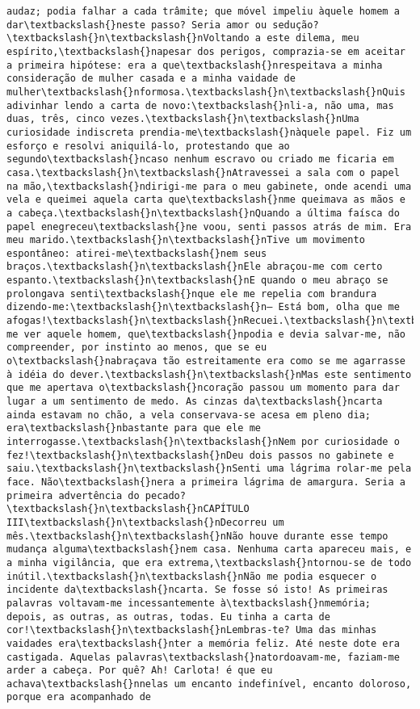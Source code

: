 \begin{Verbatim}[commandchars=\\\{\}]
audaz; podia falhar a cada trâmite; que móvel impeliu àquele homem a dar\textbackslash{}neste passo? Seria amor ou sedução?\textbackslash{}n\textbackslash{}nVoltando a este dilema, meu espírito,\textbackslash{}napesar dos perigos, comprazia-se em aceitar a primeira hipótese: era a que\textbackslash{}nrespeitava a minha consideração de mulher casada e a minha vaidade de mulher\textbackslash{}nformosa.\textbackslash{}n\textbackslash{}nQuis adivinhar lendo a carta de novo:\textbackslash{}nli-a, não uma, mas duas, três, cinco vezes.\textbackslash{}n\textbackslash{}nUma curiosidade indiscreta prendia-me\textbackslash{}nàquele papel. Fiz um esforço e resolvi aniquilá-lo, protestando que ao segundo\textbackslash{}ncaso nenhum escravo ou criado me ficaria em casa.\textbackslash{}n\textbackslash{}nAtravessei a sala com o papel na mão,\textbackslash{}ndirigi-me para o meu gabinete, onde acendi uma vela e queimei aquela carta que\textbackslash{}nme queimava as mãos e a cabeça.\textbackslash{}n\textbackslash{}nQuando a última faísca do papel enegreceu\textbackslash{}ne voou, senti passos atrás de mim. Era meu marido.\textbackslash{}n\textbackslash{}nTive um movimento espontâneo: atirei-me\textbackslash{}nem seus braços.\textbackslash{}n\textbackslash{}nEle abraçou-me com certo espanto.\textbackslash{}n\textbackslash{}nE quando o meu abraço se prolongava senti\textbackslash{}nque ele me repelia com brandura dizendo-me:\textbackslash{}n\textbackslash{}n— Está bom, olha que me afogas!\textbackslash{}n\textbackslash{}nRecuei.\textbackslash{}n\textbackslash{}nEstristeceu-me ver aquele homem, que\textbackslash{}npodia e devia salvar-me, não compreender, por instinto ao menos, que se eu o\textbackslash{}nabraçava tão estreitamente era como se me agarrasse à idéia do dever.\textbackslash{}n\textbackslash{}nMas este sentimento que me apertava o\textbackslash{}ncoração passou um momento para dar lugar a um sentimento de medo. As cinzas da\textbackslash{}ncarta ainda estavam no chão, a vela conservava-se acesa em pleno dia; era\textbackslash{}nbastante para que ele me interrogasse.\textbackslash{}n\textbackslash{}nNem por curiosidade o fez!\textbackslash{}n\textbackslash{}nDeu dois passos no gabinete e saiu.\textbackslash{}n\textbackslash{}nSenti uma lágrima rolar-me pela face. Não\textbackslash{}nera a primeira lágrima de amargura. Seria a primeira advertência do pecado?\textbackslash{}n\textbackslash{}nCAPÍTULO III\textbackslash{}n\textbackslash{}nDecorreu um mês.\textbackslash{}n\textbackslash{}nNão houve durante esse tempo mudança alguma\textbackslash{}nem casa. Nenhuma carta apareceu mais, e a minha vigilância, que era extrema,\textbackslash{}ntornou-se de todo inútil.\textbackslash{}n\textbackslash{}nNão me podia esquecer o incidente da\textbackslash{}ncarta. Se fosse só isto! As primeiras palavras voltavam-me incessantemente à\textbackslash{}nmemória; depois, as outras, as outras, todas. Eu tinha a carta de cor!\textbackslash{}n\textbackslash{}nLembras-te? Uma das minhas vaidades era\textbackslash{}nter a memória feliz. Até neste dote era castigada. Aquelas palavras\textbackslash{}natordoavam-me, faziam-me arder a cabeça. Por quê? Ah! Carlota! é que eu achava\textbackslash{}nnelas um encanto indefinível, encanto doloroso, porque era acompanhado de 
\end{Verbatim}
